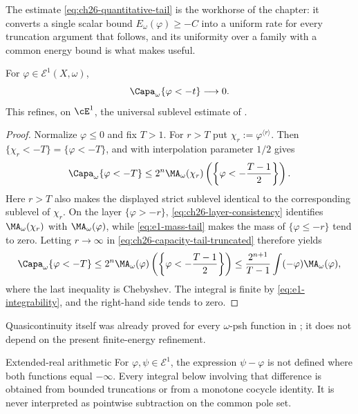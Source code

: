 The estimate \eqref{eq:ch26-quantitative-tail} is the workhorse of the
chapter: it converts a single scalar bound $E_\omega(\varphi)\geq-C$ into a
uniform rate for every truncation argument that follows, and its uniformity
over a family with a common energy bound is what makes
 useful.

\begin{corollary}
\label{cor:e1-capacity-tail}
For $\varphi\in\mathcal E^1(X,\omega)$,
\begin{equation}
\label{eq:e1-capacity-tail}
                       \Capa_\omega\{\varphi<-t\}\longrightarrow0.
\end{equation}
This refines, on $\cE^1$, the universal sublevel estimate of
.
\end{corollary}

\begin{proof}
Normalize $\varphi\leq0$ and fix $T>1$.  For $r>T$ put
$\chi_r:=\varphi^{\langle r\rangle}$.  Then
$\{\chi_r<-T\}=\{\varphi<-T\}$, and
 with interpolation parameter $1/2$
gives
\begin{equation}
\label{eq:ch26-capacity-tail-truncated}
 \Capa_\omega\{\varphi<-T\}
 \leq2^n\MA_\omega(\chi_r)
   \left(\left\{\varphi<-\frac{T-1}{2}\right\}\right).
\end{equation}
Here $r>T$ also makes the displayed strict sublevel identical to the
corresponding sublevel of $\chi_r$.  On the layer $\{\varphi>-r\}$,
\eqref{eq:ch26-layer-consistency} identifies
$\MA_\omega(\chi_r)$ with $\MA_\omega(\varphi)$, while
\eqref{eq:e1-mass-tail} makes the mass of $\{\varphi\leq-r\}$ tend to zero.
Letting $r\to\infty$ in \eqref{eq:ch26-capacity-tail-truncated} therefore
yields
\[
 \Capa_\omega\{\varphi<-T\}
 \leq2^n\MA_\omega(\varphi)
   \left(\left\{\varphi<-\frac{T-1}{2}\right\}\right)
 \leq\frac{2^{n+1}}{T-1}
       \int(-\varphi)\MA_\omega(\varphi),
\]
where the last inequality is Chebyshev.  The integral is finite by
\eqref{eq:e1-integrability}, and the right-hand side tends to zero.
\end{proof}

Quasicontinuity itself was already proved for every $\omega$-psh function
in ; it does not depend on the present
finite-energy refinement.

\begin{warning}{Extended-real arithmetic}
For $\varphi,\psi\in\mathcal E^1$, the expression
$\psi-\varphi$ is not defined where both functions equal $-\infty$.
Every integral below involving that difference is obtained from bounded
truncations or from a monotone cocycle identity. It is never interpreted as
pointwise subtraction on the common pole set.
\end{warning}

